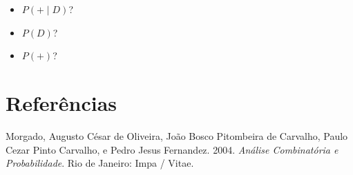 \documentclass[
  11pt]{report}
\newlength{\cslhangindent}
\newlength{\cslentryspacingunit} %
\newenvironment{CSLReferences}[2] %
 {%
  \setlength{\parindent}{0pt}
  \ifodd #1
  \let\oldpar\par
  \def\par{\hangindent=\cslhangindent\oldpar}
  \fi
  \setlength{\parskip}{#2\cslentryspacingunit}
 }%
 {}
\begin{document}
\begin{itemize}
  \begin{itemize}
  \item
    $P(+ \mid D)$?
  \item
    $P(D)$?
  \item
    $P(+)$?
  \end{itemize}
\end{itemize}

\hypertarget{referuxeancias}{%
\chapter*{Referências}\label{referuxeancias}}

\hypertarget{refs}{}
\begin{CSLReferences}{1}{0}
\leavevmode{}%
Morgado, Augusto César de Oliveira, João Bosco Pitombeira de Carvalho, Paulo Cezar Pinto Carvalho, e Pedro Jesus Fernandez. 2004. \emph{Análise Combinatória e Probabilidade}. {Rio de Janeiro}: {Impa / Vitae}.

\end{CSLReferences}
\end{document}
